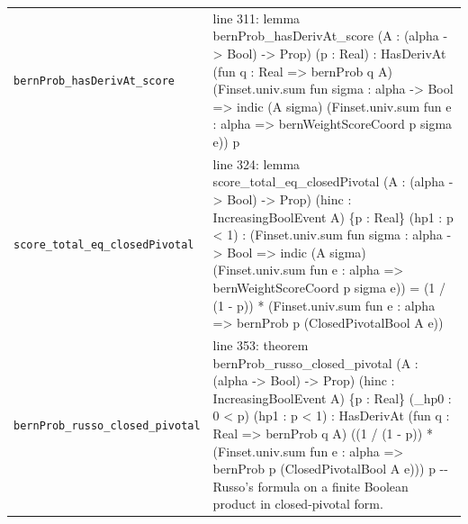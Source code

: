 \documentclass[10pt]{article}
\begin{document}
\begin{longtable}{>{\raggedright\arraybackslash}p{} >{\raggedright\arraybackslash}p{}}
\texttt{bernProb\_\allowbreak{}hasDerivAt\_\allowbreak{}score} & {\ttfamily\scriptsize line 311:\allowbreak{} lemma bernProb\_\allowbreak{}hasDerivAt\_\allowbreak{}score (\allowbreak{}A :\allowbreak{} (\allowbreak{}alpha -\allowbreak{}> Bool)\allowbreak{} -\allowbreak{}> Prop)\allowbreak{} (\allowbreak{}p :\allowbreak{} Real)\allowbreak{} :\allowbreak{} HasDerivAt (\allowbreak{}fun q :\allowbreak{} Real =\allowbreak{}> bernProb q A)\allowbreak{} (\allowbreak{}Finset.\allowbreak{}univ.\allowbreak{}sum fun sigma :\allowbreak{} alpha -\allowbreak{}> Bool =\allowbreak{}> indic (\allowbreak{}A sigma)\allowbreak{} (\allowbreak{}Finset.\allowbreak{}univ.\allowbreak{}sum fun e :\allowbreak{} alpha =\allowbreak{}> bernWeightScoreCoord p sigma e)\allowbreak{})\allowbreak{} p} \\[0.45em]
\texttt{score\_\allowbreak{}total\_\allowbreak{}eq\_\allowbreak{}closedPivotal} & {\ttfamily\scriptsize line 324:\allowbreak{} lemma score\_\allowbreak{}total\_\allowbreak{}eq\_\allowbreak{}closedPivotal (\allowbreak{}A :\allowbreak{} (\allowbreak{}alpha -\allowbreak{}> Bool)\allowbreak{} -\allowbreak{}> Prop)\allowbreak{} (\allowbreak{}hinc :\allowbreak{} IncreasingBoolEvent A)\allowbreak{} \{p :\allowbreak{} Real\} (\allowbreak{}hp1 :\allowbreak{} p < 1)\allowbreak{} :\allowbreak{} (\allowbreak{}Finset.\allowbreak{}univ.\allowbreak{}sum fun sigma :\allowbreak{} alpha -\allowbreak{}> Bool =\allowbreak{}> indic (\allowbreak{}A sigma)\allowbreak{} (\allowbreak{}Finset.\allowbreak{}univ.\allowbreak{}sum fun e :\allowbreak{} alpha =\allowbreak{}> bernWeightScoreCoord p sigma e)\allowbreak{})\allowbreak{} =\allowbreak{} (\allowbreak{}1 /\allowbreak{} (\allowbreak{}1 -\allowbreak{} p)\allowbreak{})\allowbreak{} *\allowbreak{} (\allowbreak{}Finset.\allowbreak{}univ.\allowbreak{}sum fun e :\allowbreak{} alpha =\allowbreak{}> bernProb p (\allowbreak{}ClosedPivotalBool A e)\allowbreak{})\allowbreak{}} \\[0.45em]
\texttt{bernProb\_\allowbreak{}russo\_\allowbreak{}closed\_\allowbreak{}pivotal} & {\ttfamily\scriptsize line 353:\allowbreak{} theorem bernProb\_\allowbreak{}russo\_\allowbreak{}closed\_\allowbreak{}pivotal (\allowbreak{}A :\allowbreak{} (\allowbreak{}alpha -\allowbreak{}> Bool)\allowbreak{} -\allowbreak{}> Prop)\allowbreak{} (\allowbreak{}hinc :\allowbreak{} IncreasingBoolEvent A)\allowbreak{} \{p :\allowbreak{} Real\} (\allowbreak{}\_\allowbreak{}hp0 :\allowbreak{} 0 < p)\allowbreak{} (\allowbreak{}hp1 :\allowbreak{} p < 1)\allowbreak{} :\allowbreak{} HasDerivAt (\allowbreak{}fun q :\allowbreak{} Real =\allowbreak{}> bernProb q A)\allowbreak{} (\allowbreak{}(\allowbreak{}1 /\allowbreak{} (\allowbreak{}1 -\allowbreak{} p)\allowbreak{})\allowbreak{} *\allowbreak{} (\allowbreak{}Finset.\allowbreak{}univ.\allowbreak{}sum fun e :\allowbreak{} alpha =\allowbreak{}> bernProb p (\allowbreak{}ClosedPivotalBool A e)\allowbreak{})\allowbreak{})\allowbreak{} p -\allowbreak{}-\allowbreak{} Russo's formula on a finite Boolean product in closed-\allowbreak{}pivotal form.\allowbreak{}} \\[0.45em]

\end{longtable}
\end{document}
